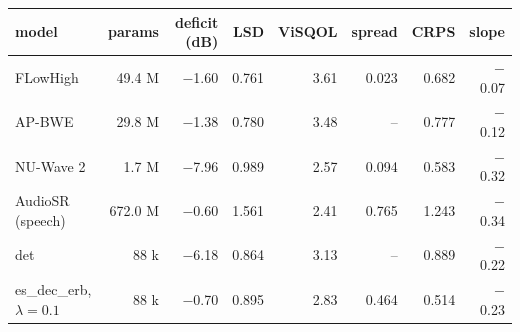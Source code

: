 \begin{tabular}{lrrrrrrr}
\toprule
model & params & deficit (dB) & LSD & ViSQOL & spread & CRPS & slope \\
\midrule
FLowHigh & 49.4 M & $-$1.60 & 0.761 & 3.61 & 0.023 & 0.682 & $-$0.07 \\
AP-BWE & 29.8 M & $-$1.38 & 0.780 & 3.48 & -- & 0.777 & $-$0.12 \\
NU-Wave 2 & 1.7 M & $-$7.96 & 0.989 & 2.57 & 0.094 & 0.583 & $-$0.32 \\
AudioSR (speech) & 672.0 M & $-$0.60 & 1.561 & 2.41 & 0.765 & 1.243 & $-$0.34 \\
det & 88 k & $-$6.18 & 0.864 & 3.13 & -- & 0.889 & $-$0.22 \\
es\_dec\_erb, $\lambda{=}0.1$ & 88 k & $-$0.70 & 0.895 & 2.83 & 0.464 & 0.514 & $-$0.23 \\
\bottomrule
\end{tabular}
